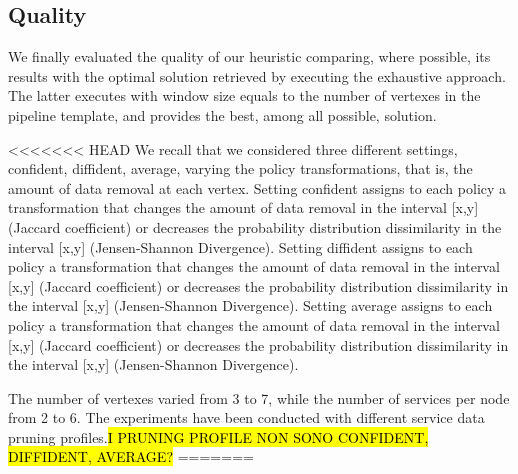 \subsection{Quality}\label{subsec:experiments_quality}
We finally evaluated the quality of our heuristic comparing, where possible, its results with the optimal solution retrieved by executing the exhaustive approach. The latter executes with window size equals to the number of vertexes in the pipeline template, and provides the best, among all possible, solution.

<<<<<<< HEAD
We recall that we considered three different settings, confident, diffident, average, varying the policy transformations, that is, the amount of data removal at each vertex. Setting confident assigns to each policy a transformation that changes the amount of data removal in the interval [x,y] (Jaccard coefficient) or decreases the probability distribution dissimilarity in the interval [x,y] (Jensen-Shannon Divergence). Setting diffident assigns to each policy a transformation that changes the amount of data removal in the interval [x,y] (Jaccard coefficient) or decreases the probability distribution dissimilarity in  the interval [x,y] (Jensen-Shannon Divergence). Setting average assigns to each policy a transformation that changes the amount of data removal in the interval [x,y] (Jaccard coefficient) or decreases the probability distribution dissimilarity in  the interval [x,y] (Jensen-Shannon Divergence).

The number of vertexes varied from 3 to 7, while the number of services per node from 2 to 6. The experiments have been conducted with different service data pruning profiles.\hl{I PRUNING PROFILE NON SONO CONFIDENT, DIFFIDENT, AVERAGE?}
=======

